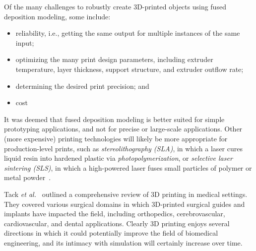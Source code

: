 Of the many challenges to robustly create 3D-printed objects using fused deposition modeling, some include:
\begin{itemize}[noitemsep]
\item reliability, i.e., getting the same output for multiple instances of the same input;
\item optimizing the many print design parameters, including extruder temperature, layer thickness, support structure, and extruder outflow rate;
\item determining the desired print precision; and
\item cost
\end{itemize}
It was deemed that fused deposition modeling is better suited for simple prototyping applications, and not for precise or large-scale applications. Other (more expensive) printing technologies will likely be more appropriate for production-level prints, such as \textit{stereolithography (SLA)}, in which a laser cures liquid resin into hardened plastic via \textit{photopolymerization}, or \textit{selective laser sintering (SLS)}, in which a high-powered laser fuses small particles of polymer or metal powder~\cite{3dprints}.

Tack \textit{et al.}~\cite{tack_2016} outlined a comprehensive review of 3D printing in medical settings. They covered various surgical domains in which 3D-printed surgical guides and implants have impacted the field, including orthopedics, cerebrovascular, cardiovascular, and dental applications. Clearly 3D printing enjoys several directions in which it could potentially improve the field of biomedical engineering, and its intimacy with simulation will certainly increase over time.
